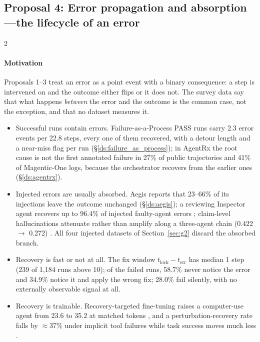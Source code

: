 \subsection{Proposal 4: Error propagation and absorption---the lifecycle of an error}\label{sec:future:lifecycle}

\begin{multicols}{2}
\paragraph{Motivation} Proposals 1--3 treat an error as a point event with a binary consequence: a step is intervened on and the outcome either flips or it does not. The survey data say that what happens \emph{between} the error and the outcome is the common case, not the exception, and that no dataset measures it.
\begin{itemize}[leftmargin=1.1em]
\item Successful runs contain errors. Failure-as-a-Process PASS runs carry 2.3 error events per 22.8 steps, every one of them recovered, with a detour length and a near-miss flag per run (\S\ref{ds:failure_as_process}); in AgentRx the root cause is not the first annotated failure in 27\% of public trajectories and 41\% of Magentic-One logs, because the orchestrator recovers from the earlier ones (\S\ref{ds:agentrx}).
\item Injected errors are usually absorbed. Aegis reports that 23--66\% of its injections leave the outcome unchanged (\S\ref{ds:aegis}); a reviewing Inspector agent recovers up to 96.4\% of injected faulty-agent errors \cite{huang2024resilience}; claim-level hallucinations attenuate rather than amplify along a three-agent chain (0.422 $\to$ 0.272) \cite{jamshidi2026cascade}. All four injected datasets of Section~\ref{sec:g2} discard the absorbed branch.
\item Recovery is fast or not at all. The fix window $t_{\mathrm{lock}}-t_{\mathrm{err}}$ has median 1 step (239 of 1,184 runs above 10); of the failed runs, 58.7\% never notice the error and 34.9\% notice it and apply the wrong fix; 28.0\% fail silently, with no externally observable signal at all.
\item Recovery is trainable. Recovery-targeted fine-tuning raises a computer-use agent from 23.6 to 35.2 at matched tokens \cite{cuarecovery2026}, and a perturbation-recovery rate falls by $\approx$37\% under implicit tool failures while task success moves much less \cite{zhu2026toolmaze}.
\end{itemize}

\end{multicols}
